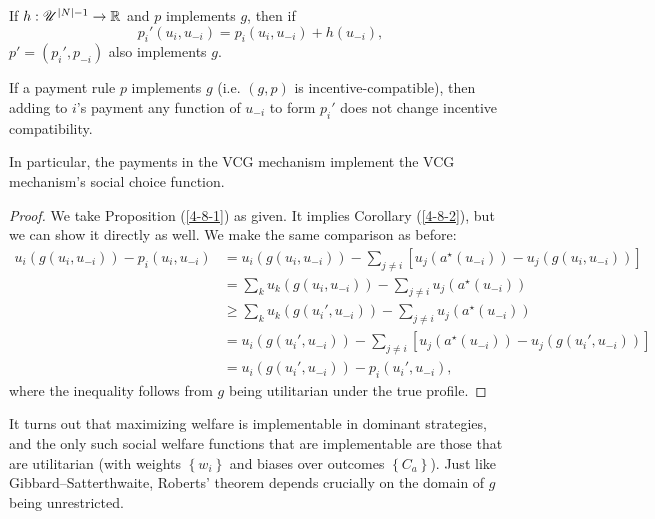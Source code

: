 \begin{proposition} \label{4-8-1}
	If $h: \mathscr{U}^{\left| N \right|-1} \to \mathbb{R}$ and $p$ implements $g$, then if \[
	p_i'\left( u_i,u_{-i} \right) = p_i\left( u_i, u_{-i} \right) + h\left( u_{-i} \right)
	,\] $p' = \left( p_i',p_{-i} \right)$ also implements $g$.
\end{proposition}
If a payment rule $p$ implements $g$ (i.e. $(g,p)$ is incentive-compatible), then adding to $i$'s payment any function of $u_{-i}$ to form $p_i'$ does not change incentive compatibility.

\begin{corollary} \label{4-8-2}
	In particular, the payments in the VCG mechanism implement the VCG mechanism's social choice function.
\end{corollary}

\begin{proof}
	We take Proposition (\ref{4-8-1}) as given. It implies Corollary (\ref{4-8-2}), but we can show it directly as well.
	We make the same comparison as before:
	\begin{align*}
		u_i\left( g(u_i,u_{-i}) \right) - p_i \left( u_i,u_{-i} \right)
		&= u_i \left( g\left( u_i, u_{-i} \right) \right) - \sum\limits_{j\ne i}^{} \left[ u_j\left( a^\star(u_{-i}) \right) - u_j\left( g\left(u_i,u_{-i} \right)\right)\right] \\
		&= \sum\limits_{k}^{} u_k\left( g\left(u_i,u_{-i} \right) \right) - \sum\limits_{j\ne i}^{} u_j\left( a^\star\left( u_{-i} \right) \right) \\
		&\ge \sum\limits_{k}^{} u_k \left( g\left( u_i', u_{-i} \right) \right) - \sum\limits_{j \ne i}^{} u_j\left( a^\star\left( u_{-i} \right) \right) \\
		&= u_i \left( g\left( u_i', u_{-i} \right) \right) - \sum\limits_{j\ne i}^{} \left[ u_j\left( a^\star\left( u_{-i} \right) \right) - u_j\left( g\left( u_i', u_{-i} \right) \right)\right] \\
		&= u_i \left( g\left( u_i', u_{-i} \right) \right) - p_i \left( u_i', u_{-i} \right)
	,\end{align*}
	where the inequality follows from $g$ being utilitarian under the true profile.
\end{proof}

It turns out that maximizing welfare is implementable in dominant strategies, and the only such social welfare functions that are implementable are those that are utilitarian (with weights $\left\{w_i\right\}$ and biases over outcomes $\left\{C_a\right\}$).
Just like Gibbard--Satterthwaite, Roberts' theorem depends crucially on the domain of $g$ being unrestricted.

